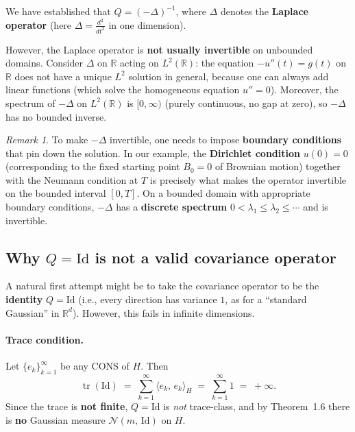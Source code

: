 \documentclass[11pt]{article}
\theoremstyle{definition}
\theoremstyle{remark}
\newtheorem{remark}{Remark}
\DeclareMathOperator{\tr}{tr}
\begin{document}
We have established that $Q = (-\Delta)^{-1}$, where $\Delta$ denotes
the \textbf{Laplace operator} (here $\Delta = \frac{d^2}{dt^2}$
in one dimension).

However, the Laplace operator is \textbf{not usually invertible}
on unbounded domains.  Consider $\Delta$ on $\mathbb{R}$ acting
on $L^2(\mathbb{R})$: the equation $-u''(t) = g(t)$ on $\mathbb{R}$
does not have a unique $L^2$ solution in general, because one can
always add linear functions (which solve the homogeneous equation
$u'' = 0$).  Moreover, the spectrum of $-\Delta$ on $L^2(\mathbb{R})$
is $[0, \infty)$ (purely continuous, no gap at zero), so $-\Delta$
has no bounded inverse.

\begin{remark}
To make $-\Delta$ invertible, one needs to impose
\textbf{boundary conditions} that pin down the solution.
In our example, the \textbf{Dirichlet condition} $u(0) = 0$
(corresponding to the fixed starting point $B_0 = 0$ of Brownian
motion) together with the Neumann condition at $T$ is precisely what
makes the operator invertible on the bounded interval $[0,T]$.
On a bounded domain with appropriate boundary conditions,
$-\Delta$ has a \textbf{discrete spectrum} $0 < \lambda_1 \le \lambda_2 \le \cdots$
and is invertible.
\end{remark}

\subsection*{Why $Q = \mathrm{Id}$ is not a valid covariance operator}

A natural first attempt might be to take the covariance operator
to be the \textbf{identity} $Q = \mathrm{Id}$
(i.e., every direction has variance $1$, as for a ``standard Gaussian''
in $\mathbb{R}^d$).  However, this fails in infinite dimensions.

\paragraph{Trace condition.}

Let $\{e_k\}_{k=1}^{\infty}$ be any CONS of $H$.  Then
\[
    \tr(\mathrm{Id})
    \;=\;
    \sum_{k=1}^{\infty}
    \langle e_k,\, e_k \rangle_H
    \;=\;
    \sum_{k=1}^{\infty} 1
    \;=\;
    +\infty.
\]
Since the trace is \textbf{not finite}, $Q = \mathrm{Id}$ is
\emph{not} trace-class, and by Theorem~1.6 there is \textbf{no}
Gaussian measure $\mathcal{N}(m,\,\mathrm{Id})$ on $H$.
\end{document}
